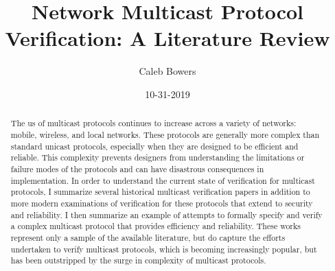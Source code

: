 \documentclass[10pt, journal]{IEEEtran}
\title{Network Multicast Protocol Verification: A Literature Review}
\author{Caleb Bowers}
\date{10-31-2019}
\begin{document}
\begin{titlingpage}
\maketitle
\begin{abstract}
The us of multicast protocols continues to increase across a variety of networks: mobile, wireless, and local networks. These protocols are generally more complex than standard unicast protocols, especially when they are designed to be efficient and reliable. This complexity prevents designers from understanding the limitations or failure modes of the protocols and can have disastrous consequences in implementation. In order to understand the current state of verification for multicast protocols, I summarize several historical multicast verification papers in addition to more modern examinations of verification for these protocols that extend to security and reliability. I then summarize an example of attempts to formally specify and verify a complex multicast protocol that provides efficiency and reliability. These works represent only a sample of the available literature, but do capture the efforts undertaken to verify multicast protocols, which is becoming increasingly popular, but has been outstripped by the surge in complexity of multicast protocols.
\end{abstract}
\end{titlingpage}

\tableofcontents
\end{document}
